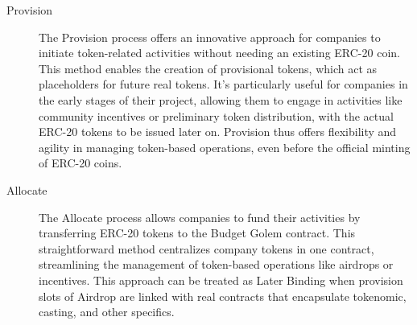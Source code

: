 \documentclass[12pt,oneside]{article}
\begin{document}
\begin{description}
  \item[Provision]
  The Provision process offers an innovative approach for companies to initiate token-related activities without needing an existing ERC-20 coin. 
  This method enables the creation of provisional tokens, 
  which act as placeholders for future real tokens. It's particularly useful for companies in the early stages of their project, allowing them to engage in 
  activities like community incentives or preliminary token distribution, with the actual ERC-20 tokens to be issued later on. Provision thus offers flexibility and agility in
  managing token-based operations, even before the official minting of ERC-20 coins.

  \item[Allocate]
  The Allocate process allows companies to fund 
  their activities by transferring ERC-20 tokens to the 
  Budget Golem contract. This straightforward method 
  centralizes company tokens in one contract, streamlining 
  the management of token-based operations like airdrops or incentives.
  This approach can be treated as Later Binding when provision slots of Airdrop are linked with real contracts that encapsulate tokenomic, casting, and other specifics.
\end{description}
\end{document}
